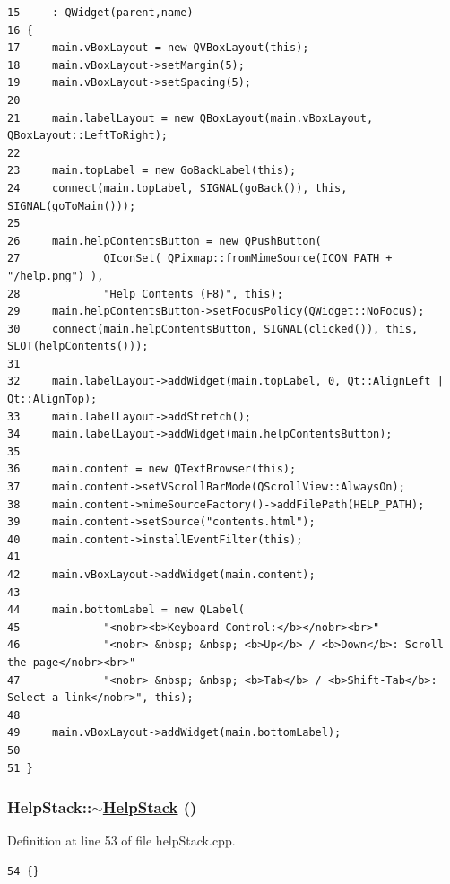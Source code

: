 \footnotesize\begin{verbatim}15     : QWidget(parent,name)
16 {
17     main.vBoxLayout = new QVBoxLayout(this);
18     main.vBoxLayout->setMargin(5);
19     main.vBoxLayout->setSpacing(5);
20     
21     main.labelLayout = new QBoxLayout(main.vBoxLayout, QBoxLayout::LeftToRight);
22     
23     main.topLabel = new GoBackLabel(this);
24     connect(main.topLabel, SIGNAL(goBack()), this, SIGNAL(goToMain()));
25     
26     main.helpContentsButton = new QPushButton(
27             QIconSet( QPixmap::fromMimeSource(ICON_PATH + "/help.png") ),
28             "Help Contents (F8)", this);
29     main.helpContentsButton->setFocusPolicy(QWidget::NoFocus);
30     connect(main.helpContentsButton, SIGNAL(clicked()), this, SLOT(helpContents()));
31     
32     main.labelLayout->addWidget(main.topLabel, 0, Qt::AlignLeft | Qt::AlignTop);
33     main.labelLayout->addStretch();
34     main.labelLayout->addWidget(main.helpContentsButton);
35     
36     main.content = new QTextBrowser(this);
37     main.content->setVScrollBarMode(QScrollView::AlwaysOn);
38     main.content->mimeSourceFactory()->addFilePath(HELP_PATH);
39     main.content->setSource("contents.html");
40     main.content->installEventFilter(this);
41     
42     main.vBoxLayout->addWidget(main.content);
43     
44     main.bottomLabel = new QLabel(
45             "<nobr><b>Keyboard Control:</b></nobr><br>"
46             "<nobr> &nbsp; &nbsp; <b>Up</b> / <b>Down</b>: Scroll the page</nobr><br>"
47             "<nobr> &nbsp; &nbsp; <b>Tab</b> / <b>Shift-Tab</b>: Select a link</nobr>", this);
48     
49     main.vBoxLayout->addWidget(main.bottomLabel);
50    
51 }
\end{verbatim}\normalsize 


\hypertarget{classHelpStack_a1}{
\subsubsection[$\sim$HelpStack]{\setlength{\rightskip}{0pt plus 5cm}Help\-Stack::$\sim$\hyperlink{classHelpStack}{Help\-Stack} ()}}
\label{classHelpStack_a1}


Definition at line 53 of file help\-Stack.cpp.

\footnotesize\begin{verbatim}54 {}
\end{verbatim}\normalsize 




